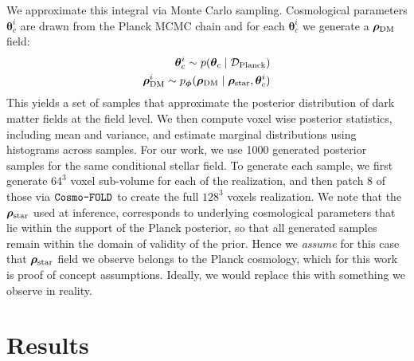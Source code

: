 We approximate this integral via Monte Carlo sampling. Cosmological parameters $\bm{\theta}_c^i$ are drawn from the Planck MCMC chain and for each $\bm{\theta}_c^i$ we generate a $\boldsymbol{\rho}_\mathrm{DM}$ field:
\begin{equation}\label{eq:sampling}
\begin{aligned}
    \bm{\theta}_c^i \sim p(\bm{\theta}_c \mid \mathcal{D}_{\mathrm{Planck}}) \\
    \boldsymbol{\rho}_\mathrm{DM}^i \sim p_{\boldsymbol{\phi}}(\boldsymbol{\rho}_\mathrm{DM} \mid \bm{\rho}_\text{star}, \bm{\theta}_c^i)
\end{aligned}
\end{equation}
This yields a set of samples that approximate the posterior distribution of dark matter fields at the field level. We then compute voxel wise posterior statistics, including mean and variance, and estimate marginal distributions using histograms across samples. For our work, we use 1000 generated posterior samples for the same conditional stellar field. To generate each sample, we first generate $64^3$ voxel sub-volume for each of the realization, and then patch 8 of those via $\texttt{Cosmo-FOLD}$ to create the full $128^3$ voxels realization. We note that the $\bm{\rho}_\text{star}$ used at inference, corresponds to underlying cosmological parameters that lie within the support of the Planck posterior, so that all generated samples remain within the domain of validity of the prior. Hence we \emph{assume} for this case that $\bm{\rho}_\text{star}$ field we observe belongs to the Planck cosmology, which for this work is proof of concept assumptions. Ideally, we would replace this with something we observe in reality.


\section{Results}
\label{sec:results}


